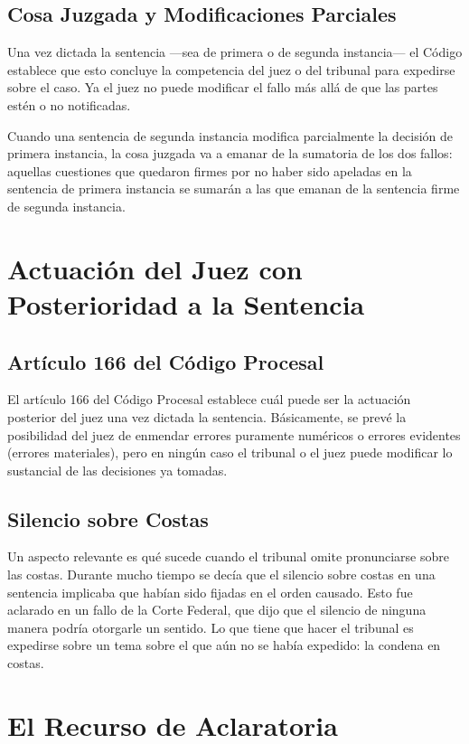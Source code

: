 \documentclass[12pt,oneside]{book}
\begin{document}
\subsection{Cosa Juzgada y Modificaciones Parciales}

Una vez dictada la sentencia —sea de primera o de segunda instancia— el Código establece que esto concluye la competencia del juez o del tribunal para expedirse sobre el caso. Ya el juez no puede modificar el fallo más allá de que las partes estén o no notificadas.

Cuando una sentencia de segunda instancia modifica parcialmente la decisión de primera instancia, la cosa juzgada va a emanar de la sumatoria de los dos fallos: aquellas cuestiones que quedaron firmes por no haber sido apeladas en la sentencia de primera instancia se sumarán a las que emanan de la sentencia firme de segunda instancia.

\section{Actuación del Juez con Posterioridad a la Sentencia}

\subsection{Artículo 166 del Código Procesal}

El artículo 166 del Código Procesal establece cuál puede ser la actuación posterior del juez una vez dictada la sentencia. Básicamente, se prevé la posibilidad del juez de enmendar errores puramente numéricos o errores evidentes (errores materiales), pero en ningún caso el tribunal o el juez puede modificar lo sustancial de las decisiones ya tomadas.

\subsection{Silencio sobre Costas}

Un aspecto relevante es qué sucede cuando el tribunal omite pronunciarse sobre las costas. Durante mucho tiempo se decía que el silencio sobre costas en una sentencia implicaba que habían sido fijadas en el orden causado. Esto fue aclarado en un fallo de la Corte Federal, que dijo que el silencio de ninguna manera podría otorgarle un sentido. Lo que tiene que hacer el tribunal es expedirse sobre un tema sobre el que aún no se había expedido: la condena en costas.

\section{El Recurso de Aclaratoria}
\end{document}
